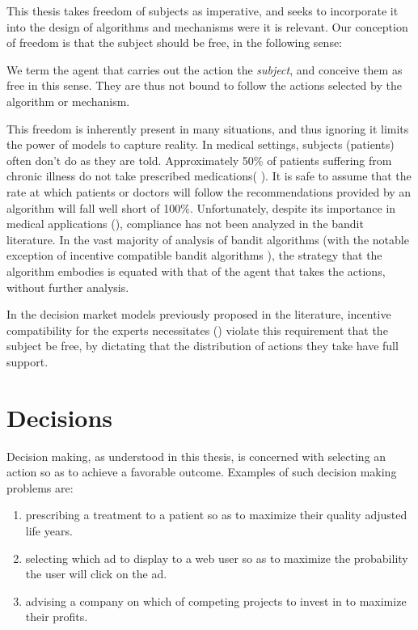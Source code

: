 This thesis takes freedom of subjects as imperative, and seeks to incorporate it into the design of algorithms and mechanisms were it is relevant.
Our conception of freedom is that the subject should be free, in the following sense:

We term the agent that carries out the action the \emph{subject}, and conceive them as free in this sense. They are thus not bound to follow the actions selected by the algorithm or mechanism.

This freedom is inherently present in many situations, and thus ignoring it limits the power of models to capture reality.
In medical settings, subjects (patients) often don't do as they are told. Approximately 50\% of patients suffering from chronic illness do not take prescribed medications( \cite{sabate:03}). It is safe to assume that the rate at which patients or doctors will follow the recommendations provided by an algorithm will fall well short of 100\%.
Unfortunately, despite its importance in medical applications (\cite{vrijens:12,hugtenburg:13}), compliance has not been analyzed in the bandit literature.
In the vast majority of analysis of bandit algorithms (with the notable exception of incentive compatible bandit algorithms \cite{kremer2014implementing,mansour2015bayesian}), the strategy that the algorithm embodies is equated with that of the agent that takes the actions, without further analysis.

In the decision market models previously proposed in the literature, incentive compatibility for the experts necessitates (\cite{othman2010decision,chen2014eliciting}) violate this requirement that the subject be free, by dictating that the distribution of actions they take have full support.


\section{Decisions}

Decision making, as understood in this thesis, is concerned with selecting an action so as to achieve a favorable outcome.
Examples of such decision making problems are:

\begin{enumerate}
	\item  prescribing a treatment to a patient so as to maximize their quality adjusted life years.
	\item selecting which ad to display to a web user so as to maximize the probability the user will click on the ad.
	\item advising a company on which of competing projects to invest in to maximize their profits.
\end{enumerate}

